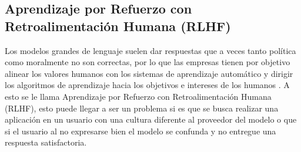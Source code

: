\subsection{Aprendizaje por Refuerzo con Retroalimentación Humana (RLHF)}

Los modelos grandes de lenguaje suelen dar respuestas que a veces tanto política como moralmente no son correctas, por lo que 
las empresas tienen por objetivo alinear los valores humanos con los sistemas de aprendizaje automático y dirigir los algoritmos 
de aprendizaje hacia los objetivos e intereses de los humanos \cite{RLHF}. A esto se le llama Aprendizaje por Refuerzo con 
Retroalimentación Humana (RLHF), esto puede llegar a ser un problema si es que se busca realizar una aplicación en un usuario con una 
cultura diferente al proveedor del modelo o que si el usuario al no expresarse bien el modelo se confunda y no entregue una respuesta 
satisfactoria.

